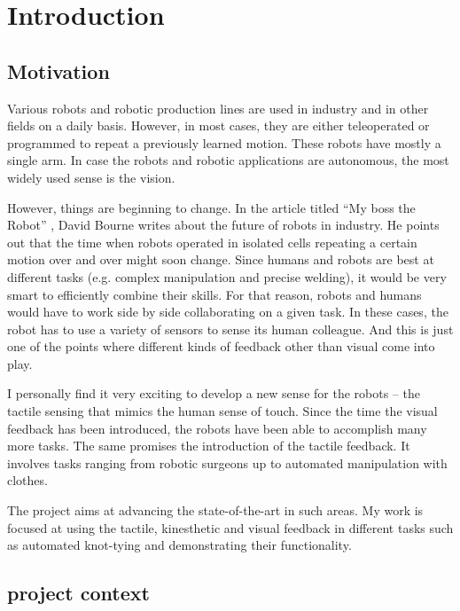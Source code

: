 \graphicspath{{Img/intro/}}

\chapter{Introduction}

    \section{Motivation}
        Various robots and robotic production lines are used in industry and in other fields on a daily basis. However, in most cases, they are either teleoperated or programmed to repeat a previously learned motion. These robots have mostly a single arm. In case the robots and robotic applications are autonomous, the most widely used sense is the vision.

        However, things are beginning to change. In the article titled ``My boss the Robot'' \cite{bourne13}, David Bourne writes about the future of robots in industry. He points out that the time when robots operated in isolated cells repeating a certain motion over and over might soon change. Since humans and robots are best at different tasks (e.g. complex manipulation and precise welding), it would be very smart to efficiently combine their skills. For that reason, robots and humans would have to work side by side collaborating on a given task. In these cases, the robot has to use a variety of sensors to sense its human colleague. And this is just one of the points where different kinds of feedback other than visual come into play.

        I personally find it very exciting to develop a new sense for the robots -- the tactile sensing that mimics the human sense of touch. Since the time the visual feedback has been introduced, the robots have been able to accomplish many more tasks. The same promises the introduction of the tactile feedback. It involves tasks ranging from robotic surgeons up to automated manipulation with clothes.

        The \CloPeMa\/ project aims at advancing the state-of-the-art in such areas. My work is focused at using the tactile, kinesthetic and visual feedback in different tasks such as automated knot-tying and demonstrating their functionality.

    \section{\CloPeMa\/ project context}

